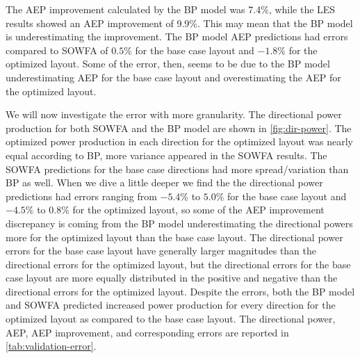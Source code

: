 \documentclass[conf]{new-aiaa}
\begin{document}
 The AEP improvement calculated by the BP model was 7.4$\%$, while the LES results showed an AEP improvement of 9.9$\%$. This may mean that the BP model is underestimating the improvement. The BP model AEP predictions had errors compared to SOWFA of $0.5\%$ for the base case layout and $-1.8\%$ for the optimized layout. Some of the error, then, seems to be due to the BP model underestimating AEP for the base case layout and overestimating the AEP for the optimized layout.

We will now investigate the error with more granularity. The directional power production for both SOWFA and the BP model are shown in \cref{fig:dir-power}. The optimized power production in each direction for the optimized layout was nearly equal according to BP, more variance appeared in the SOWFA results. The SOWFA predictions for the base case directions had more spread/variation than BP as well. When we dive a little deeper we find the the directional power predictions had errors ranging from $-5.4\%$ to $5.0\%$ for the base case layout and $-4.5\%$ to $0.8\%$ for the optimized layout, so some of the AEP improvement discrepancy is coming from the BP model underestimating the directional powers more for the optimized layout than the base case layout. The directional power errors for the base case layout have generally larger magnitudes than the directional errors for the optimized layout, but the directional errors for the base case layout are more equally distributed in the positive and negative than the directional errors for the optimized layout. Despite the errors, both the BP model and SOWFA predicted increased power production for every direction for the optimized layout as compared to the base case layout. The directional power, AEP, AEP improvement, and corresponding errors are reported in \cref{tab:validation-error}.
%
\end{document}
